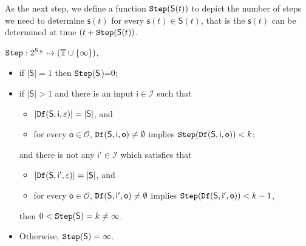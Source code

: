 As the next step, we define a function ${\tt Step}(\mathsf{S}(t))$ to depict the number of steps we need to determine $\mathsf{s}(t)$ for every $\mathsf{s}(t)\in \mathsf{S}(t)$, that is the $\mathsf{s}(t)$ can be determined at time $(t+{\tt Step}(\mathsf{S}(t))$.
\begin{definition}[$\Ks(\mathsf{S})$] ${\tt Step}:2^{\mathcal{S}_{\mathcal{B}}} \mapsto (\mathbb{T}\cup\{\infty\})$,
 \begin{itemize}
 \item   if $|\mathsf{S}|=1$ then ${\tt Step}(\mathsf{S}$)=0;
 \item  if $|\mathsf{S}|>1$ and there is an input $\mathsf{i} \in \mathcal{I}$ such that %
 \begin{itemize}
 \item  $|{\tt Df}(\mathsf{S},\mathsf{i},\varepsilon)|=|\mathsf{S}|$, and 
 \item   for every $\mathsf{o} \in \mathcal{O}$, ${\tt Df}(\mathsf{S},\mathsf{i},\mathsf{o})\ne \emptyset$ implies ${\tt Step}({\tt Df}(\mathsf{S},\mathsf{i},\mathsf{o}))< k$;
 \end{itemize} 
 and there is not any $\mathsf{i}' \in \mathcal{I}$ which satisfies that
  \begin{itemize}
 \item  $|{\tt Df}(\mathsf{S},\mathsf{i}',\varepsilon)|=|\mathsf{S}|$, and 
 \item   for every $\mathsf{o} \in \mathcal{O}$, ${\tt Df}(\mathsf{S},\mathsf{i}',\mathsf{o})\ne\emptyset$ implies ${\tt Step}({\tt Df}(\mathsf{S},\mathsf{i'},\mathsf{o}))< k-1$, 
 \end{itemize} 
then $0<{\tt Step}(\mathsf{S})=k\ne \infty$.%
 \item Otherwise, ${\tt Step}(\mathsf{S})=\infty$.
 \end{itemize}
\end{definition}

